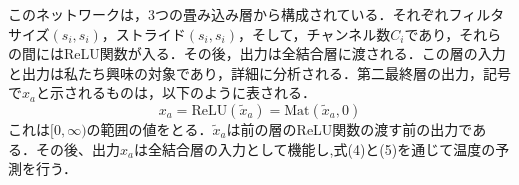 \documentclass[a4paper,11pt]{jsarticle}
\begin{document}
このネットワークは，3つの畳み込み層から構成されている．それぞれフィルタサイズ$(s_i,s_i)$，ストライド$(s_i,s_i)$，そして，チャンネル数$C_i$であり，それらの間にはReLU関数が入る．その後，出力は全結合層に渡される．この層の入力と出力は私たち興味の対象であり，詳細に分析される．第二最終層の出力，記号で$x_a$と示されるものは，以下のように表される．
\begin{equation}
  x_a = \text{ReLU}(\tilde{x}_a) = \text{Mat}(\tilde{x}_a,0)
\end{equation}
これは$[0,\infty)$の範囲の値をとる．$\tilde{x}_a$は前の層のReLU関数の渡す前の出力である．その後、出力$x_a$は全結合層の入力として機能し,式(4)と(5)を通じて温度の予測を行う．
\end{document}
